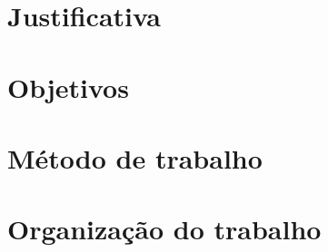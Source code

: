 \section{Justificativa}


\section{Objetivos}


\section{Método de trabalho}


\section{Organização do trabalho}


